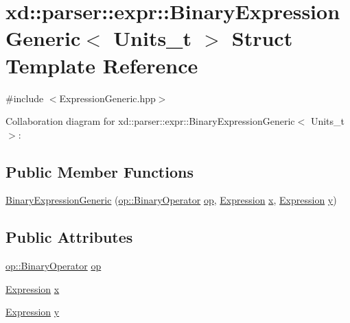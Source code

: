 \hypertarget{structxd_1_1parser_1_1expr_1_1_binary_expression_generic}{}\section{xd\+:\+:parser\+:\+:expr\+:\+:Binary\+Expression\+Generic$<$ Units\+\_\+t $>$ Struct Template Reference}
\label{structxd_1_1parser_1_1expr_1_1_binary_expression_generic}


{\ttfamily \#include $<$Expression\+Generic.\+hpp$>$}



Collaboration diagram for xd\+:\+:parser\+:\+:expr\+:\+:Binary\+Expression\+Generic$<$ Units\+\_\+t $>$\+:
\subsection*{Public Member Functions}
\begin{DoxyCompactItemize}
\item 
\mbox{\hyperlink{structxd_1_1parser_1_1expr_1_1_binary_expression_generic_a13688fc2568db01d54d15cc122a1226d}{Binary\+Expression\+Generic}} (\mbox{\hyperlink{namespacexd_1_1parser_1_1expr_1_1op_a5d85beecf0ae4a43576fdeacb264886a}{op\+::\+Binary\+Operator}} \mbox{\hyperlink{structxd_1_1parser_1_1expr_1_1_binary_expression_generic_af5907465836fde213939e2842fa55cd2}{op}}, \mbox{\hyperlink{structxd_1_1parser_1_1expr_1_1_expression_generic}{Expression}} \mbox{\hyperlink{structxd_1_1parser_1_1expr_1_1_binary_expression_generic_abb831e984c717ab64e8ea91495b104a0}{x}}, \mbox{\hyperlink{structxd_1_1parser_1_1expr_1_1_expression_generic}{Expression}} \mbox{\hyperlink{structxd_1_1parser_1_1expr_1_1_binary_expression_generic_a22a6d086ea68984905e80f86321e815f}{y}})
\end{DoxyCompactItemize}
\subsection*{Public Attributes}
\begin{DoxyCompactItemize}
\item 
\mbox{\hyperlink{namespacexd_1_1parser_1_1expr_1_1op_a5d85beecf0ae4a43576fdeacb264886a}{op\+::\+Binary\+Operator}} \mbox{\hyperlink{structxd_1_1parser_1_1expr_1_1_binary_expression_generic_af5907465836fde213939e2842fa55cd2}{op}}
\item 
\mbox{\hyperlink{structxd_1_1parser_1_1expr_1_1_expression_generic}{Expression}} \mbox{\hyperlink{structxd_1_1parser_1_1expr_1_1_binary_expression_generic_abb831e984c717ab64e8ea91495b104a0}{x}}
\item 
\mbox{\hyperlink{structxd_1_1parser_1_1expr_1_1_expression_generic}{Expression}} \mbox{\hyperlink{structxd_1_1parser_1_1expr_1_1_binary_expression_generic_a22a6d086ea68984905e80f86321e815f}{y}}
\end{DoxyCompactItemize}


